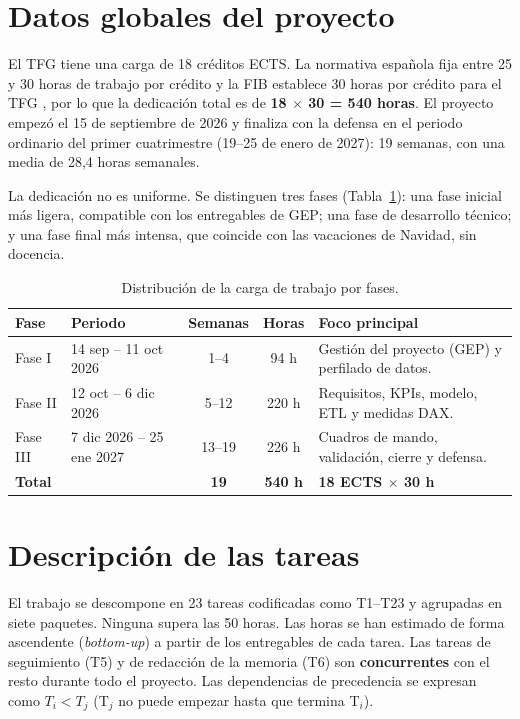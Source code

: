 \documentclass[12pt, a4paper, oneside]{report}
\begin{document}
\section{Datos globales del proyecto}
El TFG tiene una carga de 18 créditos ECTS. La normativa española fija entre 25 y 30 horas de trabajo por crédito \cite{boe_rd1125_2003} y la FIB establece 30 horas por crédito para el TFG \cite{fib_normativa_tfg}, por lo que la dedicación total es de \textbf{18 $\times$ 30 = 540 horas}. El proyecto empezó el 15 de septiembre de 2026 y finaliza con la defensa en el periodo ordinario del primer cuatrimestre (19--25 de enero de 2027): 19 semanas, con una media de 28,4 horas semanales.

La dedicación no es uniforme. Se distinguen tres fases (Tabla~\ref{tab:fases}): una fase inicial más ligera, compatible con los entregables de GEP; una fase de desarrollo técnico; y una fase final más intensa, que coincide con las vacaciones de Navidad, sin docencia.

\begin{table}[H]
\centering
\small
\renewcommand{\arraystretch}{1.1}
\begin{tabularx}{\textwidth}{@{} p{1.6cm} p{4.2cm} c c X @{}}
\toprule
\textbf{Fase} & \textbf{Periodo} & \textbf{Semanas} & \textbf{Horas} & \textbf{Foco principal} \\ \midrule
Fase I & 14 sep -- 11 oct 2026 & 1--4 & 94 h & Gestión del proyecto (GEP) y perfilado de datos. \\
Fase II & 12 oct -- 6 dic 2026 & 5--12 & 220 h & Requisitos, KPIs, modelo, ETL y medidas DAX. \\
Fase III & 7 dic 2026 -- 25 ene 2027 & 13--19 & 226 h & Cuadros de mando, validación, cierre y defensa. \\ \midrule
\textbf{Total} & & \textbf{19} & \textbf{540 h} & \textbf{18 ECTS $\times$ 30 h} \\ \bottomrule
\end{tabularx}
\caption{Distribución de la carga de trabajo por fases.}
\label{tab:fases}
\end{table}

\section{Descripción de las tareas}
El trabajo se descompone en 23 tareas codificadas como T1--T23 y agrupadas en siete paquetes. Ninguna supera las 50 horas. Las horas se han estimado de forma ascendente (\textit{bottom-up}) a partir de los entregables de cada tarea. Las tareas de seguimiento (T5) y de redacción de la memoria (T6) son \textbf{concurrentes} con el resto durante todo el proyecto. Las dependencias de precedencia se expresan como $T_i < T_j$ (T$_j$ no puede empezar hasta que termina T$_i$).
\end{document}
